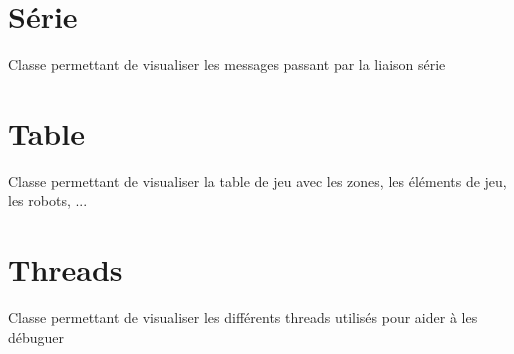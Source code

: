 \documentclass[letterpaper,10pt,french]{sphinxmanual}
\begin{document}
\section{Série}
\label{visualisation:serie}\label{visualisation:module-lib.visualisation.visu_serie}

\begin{fulllineitems}
\label{visualisation:lib.visualisation.visu_serie.Visu_serie}
Classe permettant de visualiser les messages passant par la liaison série

\end{fulllineitems}



\section{Table}
\label{visualisation:table}\label{visualisation:module-lib.visualisation.visu_table}

\begin{fulllineitems}
\label{visualisation:lib.visualisation.visu_table.Visu_table}
Classe permettant de visualiser la table de jeu avec les zones, les éléments de jeu, les robots, ...

\end{fulllineitems}



\section{Threads}
\label{visualisation:module-lib.visualisation.visu_threads}\label{visualisation:threads}

\begin{fulllineitems}
\label{visualisation:lib.visualisation.visu_threads.Visu_threads}
Classe permettant de visualiser les différents threads utilisés pour aider à les débuguer

\end{fulllineitems}
\end{document}

